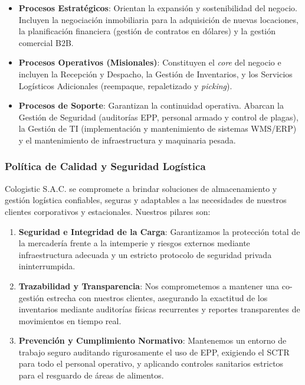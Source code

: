 \documentclass[11pt]{article}
\begin{document}
\begin{itemize}
\item
  \textbf{Procesos Estratégicos}: Orientan la expansión y sostenibilidad del
  negocio. Incluyen la negociación inmobiliaria para la adquisición de
  nuevas locaciones, la planificación financiera (gestión de contratos
  en dólares) y la gestión comercial B2B.
\item
  \textbf{Procesos Operativos (Misionales)}: Constituyen el \emph{core} del
  negocio e incluyen la Recepción y Despacho, la Gestión de Inventarios,
  y los Servicios Logísticos Adicionales (reempaque, repaletizado y
  \emph{picking}).
\item
  \textbf{Procesos de Soporte}: Garantizan la continuidad operativa. Abarcan la
  Gestión de Seguridad (auditorías EPP, personal armado y control de
  plagas), la Gestión de TI (implementación y mantenimiento de sistemas
  WMS/ERP) y el mantenimiento de infraestructura y maquinaria pesada.
\end{itemize}

\subsubsection{Política de Calidad y Seguridad Logística}

Cologistic S.A.C. se compromete a brindar soluciones de almacenamiento y gestión logística
confiables, seguras y adaptables a las necesidades de nuestros
clientes corporativos y estacionales. Nuestros pilares son:

\begin{enumerate}
\def\labelenumi{\arabic{enumi}.}
\item
  \textbf{Seguridad e Integridad de la Carga}: Garantizamos la protección total
  de la mercadería frente a la intemperie y riesgos externos mediante
  infraestructura adecuada y un estricto protocolo de seguridad privada
  ininterrumpida.
\item
  \textbf{Trazabilidad y Transparencia}: Nos comprometemos a mantener una
  co-gestión estrecha con nuestros clientes, asegurando la exactitud de
  los inventarios mediante auditorías físicas recurrentes y reportes
  transparentes de movimientos en tiempo real.
\item
  \textbf{Prevención y Cumplimiento Normativo}: Mantenemos un entorno de trabajo
  seguro auditando rigurosamente el uso de EPP, exigiendo el SCTR para
  todo el personal operativo, y aplicando controles sanitarios estrictos
  para el resguardo de áreas de alimentos.
\end{enumerate}
\end{document}
